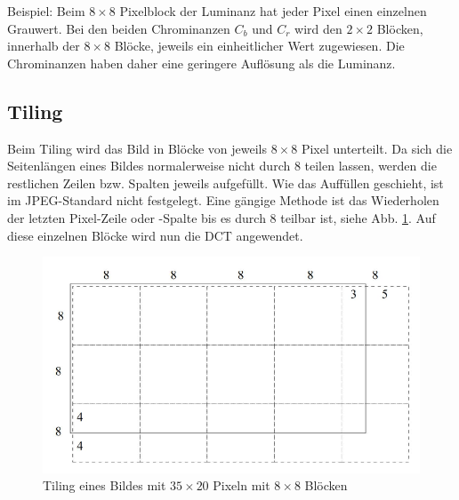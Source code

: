 Beispiel: Beim \(8\times8\) Pixelblock der Luminanz hat jeder Pixel einen einzelnen Grauwert.
Bei den beiden Chrominanzen \(C_b\) und \(C_r\) wird den \(2\times2\) Blöcken, innerhalb der \(8\times8\) Blöcke, jeweils ein einheitlicher Wert zugewiesen.
Die Chrominanzen haben daher eine geringere Auflösung als die Luminanz.

\subsection{Tiling
\label{jpeg:subsection:tiling}}
Beim Tiling wird das Bild in Blöcke von jeweils \(8\times8\) Pixel unterteilt.
Da sich die Seitenlängen eines Bildes normalerweise nicht durch 8 teilen lassen, werden die restlichen Zeilen bzw. Spalten jeweils aufgefüllt.
Wie das Auffüllen geschieht, ist im JPEG-Standard nicht festgelegt.
Eine gängige Methode ist das Wiederholen der letzten Pixel-Zeile oder -Spalte bis es durch 8 teilbar ist, siehe Abb. \ref{jpeg:fig:tiling}.
Auf diese einzelnen Blöcke wird nun die DCT angewendet.

\begin{figure}
    \centering
    \includegraphics[width=120mm]{papers/jpeg/pictures/unterteilung.pdf}
    \caption{Tiling eines Bildes mit \(35\times20\) Pixeln mit \(8\times8\) Blöcken
        \label{jpeg:fig:tiling}}
\end{figure}

